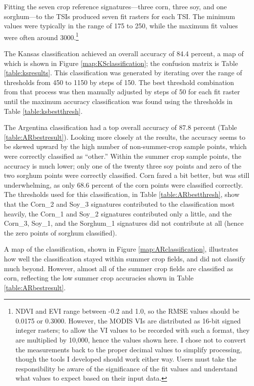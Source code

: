 Fitting the seven crop reference signatures---three corn, three soy, and one sorghum---to the TSIs produced seven fit rasters for each TSI. The minimum values were typically in the range of 175 to 250, while the maximum fit values were often around 3000.\footnote{NDVI and EVI range between -0.2 and 1.0, so the RMSE values should be 0.0175 or 0.3000. However, the MODIS VIs are distributed as 16-bit signed integer rasters; to allow the VI values to be recorded with such a format, they are multiplied by 10,000, hence the values shown here. I chose not to convert the measurements back to the proper decimal values to simplify processing, though the tools I developed should work either way.  Users must take the responsibility be aware of the significance of the fit values and understand what values to expect based on their input data.} 

The Kansas classification achieved an overall accuracy of 84.4 percent, a map of which is shown in Figure \ref{map:KSclassification}; the confusion matrix is Table \ref{table:ksresults}. This classification was generated by iterating over the range of thresholds from 450 to 1150 by steps of 150. The best threshold combination from that process was then manually adjusted by steps of 50 for each fit raster until the maximum accuracy classification was found using the thresholds in Table \ref{table:ksbestthresh}.

The Argentina classification had a top overall accuracy of 87.8 percent (Table \ref{table:ARbestresult}). Looking more closely at the results, the accuracy seems to be skewed upward by the high number of non-summer-crop sample points, which were correctly classified as ``other.'' Within the summer crop sample points, the accuracy is much lower; only one of the twenty three soy points and zero of the two sorghum points were correctly classified. Corn fared a bit better, but was still underwhelming, as only 68.6 percent of the corn points were classified correctly. The thresholds used for this classification, in Table \ref{table:ARbestthresh}, show that the Corn\_2 and Soy\_3 signatures contributed to the classification most heavily, the Corn\_1 and Soy\_2 signatures contributed only a little, and the Corn\_3, Soy\_1, and the Sorghum\_1 signatures did not contribute at all (hence the zero points of sorghum classified).

A map of the classification, shown in Figure \ref{map:ARclassification}, illustrates how well the classification stayed within summer crop fields, and did not classify much beyond. However, almost all of the summer crop fields are classified as corn, reflecting the low summer crop accuracies shown in Table \ref{table:ARbestresult}.

